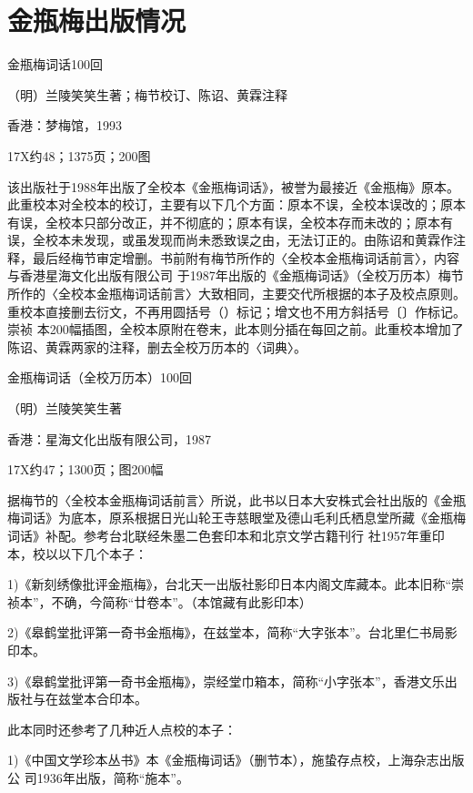 %

\chapter*{金瓶梅出版情况}

金瓶梅词话100回

（明）兰陵笑笑生著；梅节校订、陈诏、黄霖注释

香港：梦梅馆，1993

17X约48；1375页；200图

该出版社于1988年出版了全校本《金瓶梅词话》，被誉为最接近《金瓶梅》原本。此重校本对全校本的校订，主要有以下几个方面：原本不误，全校本误改的；原本有误，全校本只部分改正，并不彻底的；原本有误，全校本存而未改的；原本有误，全校本未发现，或虽发现而尚未悉致误之由，无法订正的。由陈诏和黄霖作注释，最后经梅节审定增删。书前附有梅节所作的〈全校本金瓶梅词话前言〉，内容与香港星海文化出版有限公司 于1987年出版的《金瓶梅词话》（全校万历本）梅节所作的〈全校本金瓶梅词话前言〉大致相同，主要交代所根据的本子及校点原则。重校本直接删去衍文，不再用圆括号（）标记；增文也不用方斜括号〔〕作标记。崇祯 本200幅插图，全校本原附在卷末，此本则分插在每回之前。此重校本增加了陈诏、黄霖两家的注释，删去全校万历本的〈词典〉。




金瓶梅词话（全校万历本）100回

（明）兰陵笑笑生著

香港：星海文化出版有限公司，1987

17X约47；1300页；图200幅

据梅节的〈全校本金瓶梅词话前言〉所说，此书以日本大安株式会社出版的《金瓶梅词话》为底本，原系根据日光山轮王寺慈眼堂及德山毛利氏栖息堂所藏《金瓶梅词话》补配。参考台北联经朱墨二色套印本和北京文学古籍刊行 社1957年重印本，校以以下几个本子：

1)《新刻绣像批评金瓶梅》，台北天一出版社影印日本内阁文库藏本。此本旧称“崇祯本”，不确，今简称“廿卷本”。（本馆藏有此影印本）

2)《皋鹤堂批评第一奇书金瓶梅》，在兹堂本，简称“大字张本”。台北里仁书局影印本。

3)《皋鹤堂批评第一奇书金瓶梅》，崇经堂巾箱本，简称“小字张本”，香港文乐出版社与在兹堂本合印本。

此本同时还参考了几种近人点校的本子：

1)《中国文学珍本丛书》本《金瓶梅词话》（删节本），施蛰存点校，上海杂志出版公 司1936年出版，简称“施本”。

